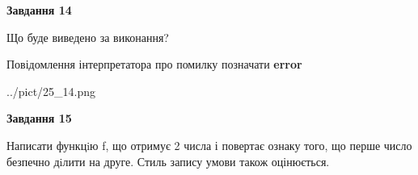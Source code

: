 \documentclass[11pt, ukrainian]{article}
\begin{document}
{\begin {large}
{\begin {center}\textbf{Завдання 14}\end {center}}\par
Що буде виведено за виконання? \par
Повідомлення інтерпретатора про помилку позначати \textbf{error}

\begin{center}
	{../pict/25_14.png}
\end{center}
\newpage

{\begin {center}\textbf{Завдання 15}\end {center}}\par

Написати функцiю f, що отримує 2 числа і повертає ознаку того, що перше число безпечно дiлити на друге. Стиль запису умови також оцінюється.\par
\newpage

\end {large}}
\end{document}
